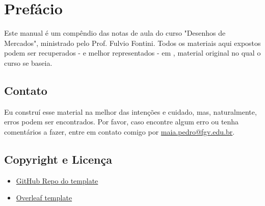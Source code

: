 \chapter*{Prefácio}


Este manual é um compêndio das notas de aula do curso "Desenhos de Mercados", ministrado pelo Prof. Fulvio Fontini. Todos os materiais aqui expostos podem ser recuperados - e melhor representados - em \textcite{cretì_fontini_2019}, material original no qual o curso se baseia.

\section*{Contato}
Eu construí esse material na melhor das intenções e cuidado, mas, naturalmente, erros podem ser encontrados. Por favor, caso encontre algum erro ou tenha comentários a fazer, entre em contato comigo por \href{mailto:maia.pedro@fgv.edu.br}{maia.pedro@fgv.edu.br}.

\section*{Copyright e Licença}

\begin{itemize}
    \item \href{https://github.com/Jue-Xu/Latex-Template-for-Scientific-Style-Book}{GitHub Repo do template}
    \item \href{https://www.overleaf.com/latex/templates/latex-template-for-scientific-style-book/ntprxjksmqxx}{Overleaf template}
\end{itemize}



